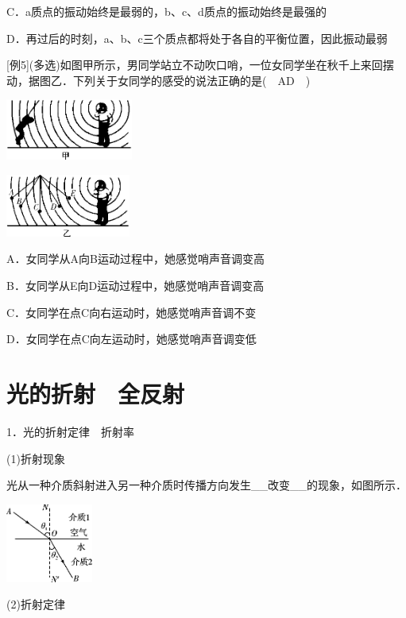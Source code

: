 C．a质点的振动始终是最弱的，b、c、d质点的振动始终是最强的

D．再过后的时刻，a、b、c三个质点都将处于各自的平衡位置，因此振动最弱

{[}例5{]}(多选)如图甲所示，男同学站立不动吹口哨，一位女同学坐在秋千上来回摆动，据图乙．下列关于女同学的感受的说法正确的是(　AD　)

\begin{center}\includegraphics[width=1.64167in,height=0.79236in]{media/image539.png}\end{center}

\begin{center}\includegraphics[width=1.61319in,height=0.81111in]{media/image540.png}\end{center}
A．女同学从A向B运动过程中，她感觉哨声音调变高

B．女同学从E向D运动过程中，她感觉哨声音调变高

C．女同学在点C向右运动时，她感觉哨声音调不变

D．女同学在点C向左运动时，她感觉哨声音调变低

\section{光的折射　全反射}



1．光的折射定律　折射率

(1)折射现象

光从一种介质斜射进入另一种介质时传播方向发生\_\_改变\_\_的现象，如图所示．

\begin{center}\includegraphics[width=1.12292in,height=1.01875in]{media/image545.png}\end{center}
(2)折射定律

